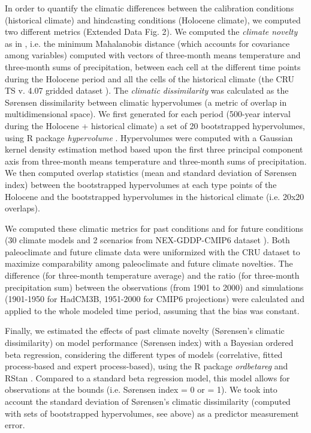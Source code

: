 \documentclass[pdflatex, sn-nature]{sn-jnl}%
\begin{document}
In order to quantify the climatic differences between the calibration conditions (historical climate) and hindcasting conditions (Holocene climate), we computed two different metrics (Extended Data Fig. 2).
We computed the \emph{climate novelty} as in \cite{Burke2019}, i.e. the minimum Mahalanobis distance (which accounts for covariance among variables) computed with vectors of three-month means temperature and three-month sums of precipitation, between each cell at the different time points during the Holocene period and all the cells of the historical climate (the CRU TS v. 4.07 gridded dataset \citep{Harris2020}). 
The \emph{climatic dissimilarity} was calculated as the Sørensen dissimilarity between climatic hypervolumes (a metric of overlap in multidimensional space). We first generated for each period (500-year interval during the Holocene + historical climate) a set of 20 bootstrapped hypervolumes, using R package \emph{hypervolume} \cite{Blonder2018}. Hypervolumes were computed with a Gaussian kernel density estimation method based upon the first three principal component axis from three-month means temperature and three-month sums of precipitation. We then computed overlap statistics (mean and standard deviation of Sørensen index) between the bootstrapped hypervolumes at each type points of the Holocene and the bootstrapped hypervolumes in the historical climate (i.e. 20x20 overlaps).

We computed these climatic metrics for past conditions and for future conditions (30 climate models and 2 scenarios from NEX-GDDP-CMIP6 dataset \citep{Thrasher2022}). Both paleoclimate and future climate data were uniformized with the CRU dataset to maximize comparability among paleoclimate and future climate novelties. The difference (for three-month temperature average) and the ratio (for three-month precipitation sum) between the observations (from 1901 to 2000) and simulations (1901-1950 for HadCM3B, 1951-2000 for CMIP6 projections) were calculated and applied to the whole modeled time period, assuming that the bias was constant.  

Finally, we estimated the effects of past climate novelty (Sørensen's climatic dissimilarity) on model performance (Sørensen index) with a Bayesian ordered beta regression, considering the different types of models (correlative, fitted process-based and expert process-based), using the R package \emph{ordbetareg} \cite{Kubinec2023} and RStan \cite{SDT2023}.
Compared to a  standard beta regression model, this model allows for observations at the bounds (i.e. Sørensen index = 0 or = 1). We took into account the standard deviation of Sørensen's climatic dissimilarity (computed with sets of bootstrapped hypervolumes, see above) as a predictor measurement error.
\end{document}
